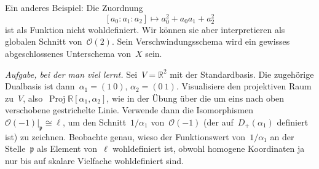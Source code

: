\documentclass[a4paper,ngerman]{scrartcl}
\renewcommand{\O}{\mathcal{O}}
\DeclareMathOperator{\Proj}{Proj}
\begin{document}
Ein anderes Beispiel: Die Zuordnung
\[ [a_0:a_1:a_2] \longmapsto a_0^2 + a_0 a_1 + a_2^2 \]
ist als Funktion nicht wohldefiniert. Wir können sie aber interpretieren als
globalen Schnitt von~$\O(2)$. Sein Verschwindungsschema wird ein gewisses
abgeschlossenes Unterschema von~$X$ sein.

\emph{Aufgabe, bei der man viel lernt.} Sei~$V = \mathbb{R}^2$ mit der
Standardbasis. Die zugehörige Dualbasis ist dann~$\alpha_1 = (1\ 0)$, $\alpha_2
= (0\ 1)$. Visualisiere den projektiven Raum zu~$V$, also~$\Proj
\mathbb{R}[\alpha_1,\alpha_2]$, wie in der Übung über die um eins nach oben
verschobene gestrichelte Linie. Verwende dann die
Isomorphismen~$\O(-1)|_\mathfrak{p} \cong \ell$, um den Schnitt~$1/\alpha_1$
von~$\O(-1)$ (der auf~$D_+(\alpha_1)$ definiert ist) zu zeichnen. Beobachte
genau, wieso der Funktionswert von~$1/\alpha_1$ an der Stelle~$\mathfrak{p}$
als Element von~$\ell$ wohldefiniert ist, obwohl homogene Koordinaten ja nur
bis auf skalare Vielfache wohldefiniert sind.
\end{document}
